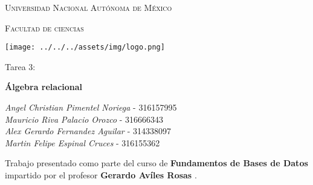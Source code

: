 \documentclass[10pt,letterpaper,fleqn]{article}
\begin{document}
    \begin{titlepage}
        \centering
    
        {\scshape\LARGE Universidad Nacional Autónoma de México \par}
    
        \vspace{1cm}
        {\scshape\Large Facultad de ciencias\par}
        \vspace{1.5cm}
    
        \begin{center}
            \texttt{[image: ../../../assets/img/logo.png]}
        \end{center}
    
        \vspace{.8 cm}
    
        {\LARGE Tarea 3: \par}
        {\huge\bfseries Álgebra relacional \par}
    
        \vspace{0.5cm}
        \large{\itshape{Angel Christian Pimentel Noriega}} \small{ - 316157995 } \\
        \large{\itshape{Mauricio Riva Palacio Orozco}} \small{ - 316666343 } \\
        \large{\itshape{Alex Gerardo Fernandez Aguilar }} \small{ - 314338097  } \\
        \large{\itshape{Martin Felipe Espinal Cruces}} \small{ - 316155362 } \\
       
        \vfill
        
        \vfill
    
        Trabajo presentado como parte del curso de
        \textbf{Fundamentos de Bases de Datos}
        impartido por el profesor \textbf{ Gerardo Avíles Rosas }. \par
        \vspace{0.1cm}
    \end{titlepage}
\end{document}
